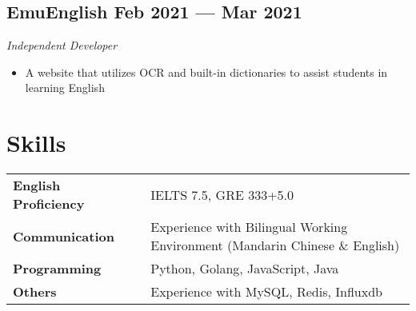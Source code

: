 \documentclass[a4,12pt]{article}
\newcommand{\subtext}[1]{
#1\par\vspace{-0.2cm}}
\newenvironment{zitemize}{
\begin{itemize}\itemsep0pt \parskip0pt \parsep1pt}
{\end{itemize}\vspace{-0.5cm}}
\newcommand{\hskills}[1]{
\textbf{\bfseries #1} }
\begin{document}
\subsection*{EmuEnglish \hfill \textbf{Feb 2021 --- Mar 2021}}
\subtext{\textit{Independent Developer}}
\begin{zitemize}
    \item A website that utilizes OCR and built-in dictionaries to assist students in learning English
\end{zitemize}


\section{\textbf{Skills}}
\begin{tabular}{p{11em} p{1em} p{43em}}
\hskills{English Proficiency} & & IELTS 7.5, GRE 333+5.0 \\
\hskills{Communication} & & Experience with Bilingual Working Environment (Mandarin Chinese \& English)  \\
\hskills{Programming} &  & Python, Golang, JavaScript, Java \\
\hskills{Others} & & Experience with MySQL, Redis, Influxdb
\end{tabular}
\vspace{-0.2cm}





\end{document}
